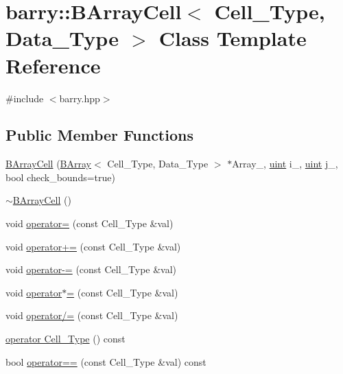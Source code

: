 \hypertarget{classbarry_1_1_b_array_cell}{}\section{barry\+:\+:B\+Array\+Cell$<$ Cell\+\_\+\+Type, Data\+\_\+\+Type $>$ Class Template Reference}
\label{classbarry_1_1_b_array_cell}


{\ttfamily \#include $<$barry.\+hpp$>$}

\subsection*{Public Member Functions}
\begin{DoxyCompactItemize}
\item 
\hyperlink{classbarry_1_1_b_array_cell_a86b3c145bfd9e3d8d4a21050580f37bd}{B\+Array\+Cell} (\hyperlink{classbarry_1_1_b_array}{B\+Array}$<$ Cell\+\_\+\+Type, Data\+\_\+\+Type $>$ $\ast$Array\+\_\+, \hyperlink{namespacebarry_a11dfc53ddb4672278319aa04f1e09a6c}{uint} i\+\_\+, \hyperlink{namespacebarry_a11dfc53ddb4672278319aa04f1e09a6c}{uint} j\+\_\+, bool check\+\_\+bounds=true)
\item 
\hyperlink{classbarry_1_1_b_array_cell_a6d5c31a74e666b22889e81ca1b40c66b}{$\sim$\+B\+Array\+Cell} ()
\item 
void \hyperlink{classbarry_1_1_b_array_cell_ad20091ef5961aed4241bd8d0b6d5dd0d}{operator=} (const Cell\+\_\+\+Type \&val)
\item 
void \hyperlink{classbarry_1_1_b_array_cell_a2e5c7efcf17bf4acaf17900fb781827b}{operator+=} (const Cell\+\_\+\+Type \&val)
\item 
void \hyperlink{classbarry_1_1_b_array_cell_a2f2d39b5e9dfe7d0ef62a42445c85439}{operator-\/=} (const Cell\+\_\+\+Type \&val)
\item 
void \hyperlink{classbarry_1_1_b_array_cell_abc193e5d3dd8d04e5d4bb8d808fde35d}{operator$\ast$=} (const Cell\+\_\+\+Type \&val)
\item 
void \hyperlink{classbarry_1_1_b_array_cell_aa5debb920d8ffc246e7d463ac8e26152}{operator/=} (const Cell\+\_\+\+Type \&val)
\item 
\hyperlink{classbarry_1_1_b_array_cell_a698f664c230f91bf03a97966378e339b}{operator Cell\+\_\+\+Type} () const
\item 
bool \hyperlink{classbarry_1_1_b_array_cell_a8d28c5b68b442ddf94cb99d8bc2f9cb9}{operator==} (const Cell\+\_\+\+Type \&val) const
\end{DoxyCompactItemize}


